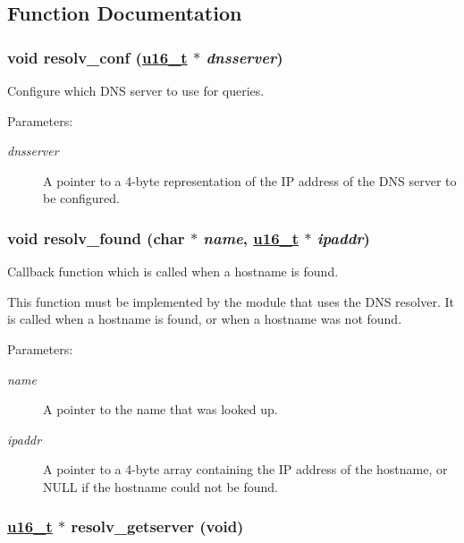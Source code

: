 \subsection{Function Documentation}
\hypertarget{a00083_gdf916e0c752f5cda70d0bddb2be422ba}{
\subsubsection[resolv\_\-conf]{\setlength{\rightskip}{0pt plus 5cm}void resolv\_\-conf (\hyperlink{a00070_gfc6499c1f28697aa3bfc2804d496fd11}{u16\_\-t} $\ast$ {\em dnsserver})}}
\label{a00083_gdf916e0c752f5cda70d0bddb2be422ba}


Configure which DNS server to use for queries. 

\begin{Desc}
\item[Parameters:]
\begin{description}
\item[{\em dnsserver}]A pointer to a 4-byte representation of the IP address of the DNS server to be configured. \end{description}
\end{Desc}
\hypertarget{a00083_g6d9751d534453425c7a5a215d1d4414c}{
\subsubsection[resolv\_\-found]{\setlength{\rightskip}{0pt plus 5cm}void resolv\_\-found (char $\ast$ {\em name}, \hyperlink{a00070_gfc6499c1f28697aa3bfc2804d496fd11}{u16\_\-t} $\ast$ {\em ipaddr})}}
\label{a00083_g6d9751d534453425c7a5a215d1d4414c}


Callback function which is called when a hostname is found. 

This function must be implemented by the module that uses the DNS resolver. It is called when a hostname is found, or when a hostname was not found.

\begin{Desc}
\item[Parameters:]
\begin{description}
\item[{\em name}]A pointer to the name that was looked up.\item[{\em ipaddr}]A pointer to a 4-byte array containing the IP address of the hostname, or NULL if the hostname could not be found. \end{description}
\end{Desc}
\hypertarget{a00083_g3191066cf8f76bd00b6843b77c37068f}{
\subsubsection[resolv\_\-getserver]{\setlength{\rightskip}{0pt plus 5cm}\hyperlink{a00070_gfc6499c1f28697aa3bfc2804d496fd11}{u16\_\-t} $\ast$ resolv\_\-getserver (void)}}
\label{a00083_g3191066cf8f76bd00b6843b77c37068f}


